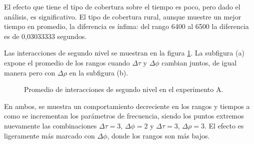 El efecto que tiene el tipo de cobertura sobre el tiempo es poco, pero dado el análisis, es significativo. El tipo de cobertura rural, aunque muestre un mejor tiempo en promedio, la diferencia es ínfima: del rango 6400 al 6500 la diferencia es de 0,03033333 segundos.

Las interacciones de segundo nivel se muestran en la figura \ref{tab:2I-A}. La subfigura (a) expone el promedio de los rangos cuando $\Delta \tau$ y $\Delta \phi$ cambian juntos, de igual manera pero con $\Delta \rho$ en la subfigura (b). 

\begin{figure}[H]

    \centering
\caption{Promedio de interacciones de segundo nivel en el experimento A.}
\label{tab:2I-A}
\end{figure}

En ambos, se muestra un comportamiento decreciente en los rangos y tiempos a como se incrementan los parámetros de frecuencia, siendo los puntos extremos nuevamente las combinaciones $\Delta \tau=3$, $\Delta \phi=2$ y $\Delta \tau=3$, $\Delta \rho=3$. El efecto es ligeramente más marcado con $\Delta \phi$, donde los rangos son más bajos.


